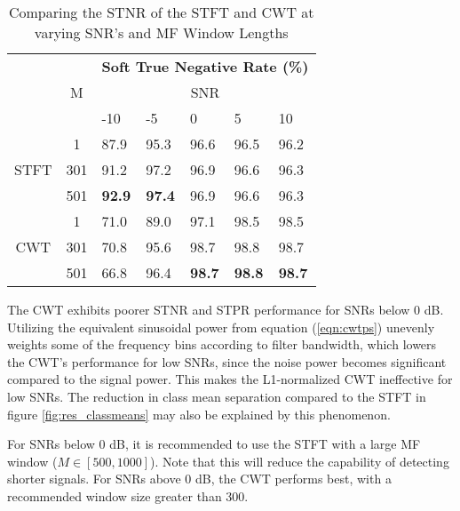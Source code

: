 \begin{table}[h!]
	\caption{Comparing the STNR of the STFT and CWT at varying SNR's and MF Window Lengths\label{tab:stnr}}
	\centering
	\begin{tabular}{cclllll}
		\hline
		\multirow{3}{*}{} & \multicolumn{1}{c}{\multirow{3}{*}{M}} & \multicolumn{5}{c}{\textbf{Soft True Negative Rate (\%)}}                   \\
		& \multicolumn{1}{c}{} & \multicolumn{5}{c}{SNR}                           \\ \cline{3-7} 
	& \multicolumn{1}{c}{} & -10  & -5           & 0    & 5   & 10   \\ \hline
\multirow{3}{*}{STFT} & 1                    & 87.9          & 95.3          & 96.6          & 96.5          & 96.2          \\
& 301                  & 91.2          & 97.2          & 96.9          & 96.6          & 96.3          \\
& 501                  & \textbf{92.9} & \textbf{97.4} & 96.9          & 96.6          & 96.3          \\ \hline
\multirow{3}{*}{CWT}  & 1                    & 71.0          & 89.0          & 97.1          & 98.5          & 98.5          \\
& 301                  & 70.8          & 95.6          & 98.7          & 98.8          & 98.7          \\
& 501                  & 66.8          & 96.4          & \textbf{98.7} & \textbf{98.8} & \textbf{98.7} \\ \hline
	\end{tabular}
\end{table}



The CWT exhibits poorer STNR and STPR performance for SNRs below 0 dB. Utilizing the equivalent sinusoidal power from equation (\ref{eqn:cwtps}) unevenly weights some of the frequency bins according to filter bandwidth, which lowers the CWT's performance for low SNRs, since the noise power becomes significant compared to the signal power. This makes the L1-normalized CWT ineffective for low SNRs. The reduction in class mean separation compared to the STFT in figure \ref{fig:res_classmeans} may also be explained by this phenomenon. 

For SNRs below 0 dB, it is recommended to use the STFT with a large MF window ($M \in [500, 1000]$). Note that this will reduce the capability of detecting shorter signals. For SNRs above 0 dB, the CWT performs best, with a recommended window size greater than 300. 

